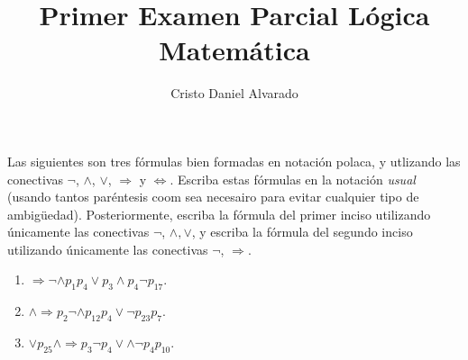 \documentclass[12pt]{article}
\newcounter{it}
\theoremstyle{largebreak}
\begin{document}
    \setlength{\parskip}{5pt} %
    \setlength{\parindent}{12pt} %
    \title{Primer Examen Parcial Lógica Matemática}
    \author{Cristo Daniel Alvarado}
    \maketitle

    \begin{excer}
        Las siguientes son tres fórmulas bien formadas en notación polaca, y utlizando las conectivas $\neg$, $\land$, $\lor$, $\Rightarrow$ y $\iff$. Escriba estas fórmulas en la notación \textit{usual} (usando tantos paréntesis coom sea necesairo para evitar cualquier tipo de ambigüedad). Posteriormente, escriba la fórmula del primer inciso utilizando únicamente las conectivas $\neg$, $\land,\lor$, y escriba la fórmula del segundo inciso utilizando únicamente las conectivas $\neg$, $\Rightarrow$.
        \begin{enumerate}[label = \textit{(\alph*)}]
            \item $\Rightarrow\neg\land p_1p_4\lor p_3\land p_4\neg p_{17}$.
            \item $\land\Rightarrow p_2\neg\land p_{12}p_4\lor\neg p_{ 23}p_7$.
            \item $\lor p_{ 25}\land\Rightarrow p_3\neg p_4\lor\land\neg p_4p_{10}$.
        \end{enumerate}
    \end{excer}
\end{document}
